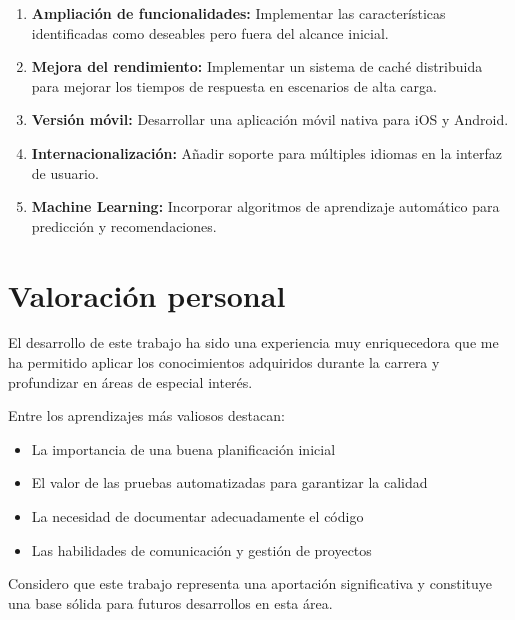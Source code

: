 \begin{enumerate}
  \item \textbf{Ampliación de funcionalidades:} Implementar las características identificadas como deseables pero fuera del alcance inicial.

  \item \textbf{Mejora del rendimiento:} Implementar un sistema de caché distribuida para mejorar los tiempos de respuesta en escenarios de alta carga.

  \item \textbf{Versión móvil:} Desarrollar una aplicación móvil nativa para iOS y Android.

  \item \textbf{Internacionalización:} Añadir soporte para múltiples idiomas en la interfaz de usuario.

  \item \textbf{Machine Learning:} Incorporar algoritmos de aprendizaje automático para predicción y recomendaciones.
\end{enumerate}

\section{Valoración personal}
\label{sec:valoracion-personal}

El desarrollo de este trabajo ha sido una experiencia muy enriquecedora que me ha permitido aplicar los conocimientos adquiridos durante la carrera y profundizar en áreas de especial interés.

Entre los aprendizajes más valiosos destacan:

\begin{itemize}
  \item La importancia de una buena planificación inicial
  \item El valor de las pruebas automatizadas para garantizar la calidad
  \item La necesidad de documentar adecuadamente el código
  \item Las habilidades de comunicación y gestión de proyectos
\end{itemize}

Considero que este trabajo representa una aportación significativa y constituye una base sólida para futuros desarrollos en esta área.
